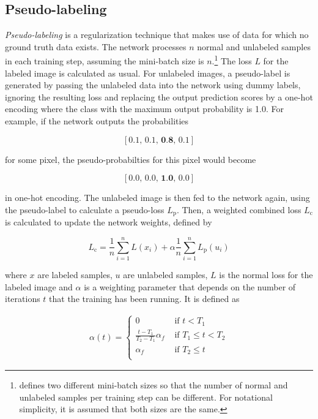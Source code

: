 	\subsection {Pseudo-labeling}
\label{subsec:pseudo_label}

\textit{Pseudo-labeling} \cite{pseudo_label} is a regularization technique that makes use of data for which no ground truth data exists. The network processes $n$ normal and unlabeled samples in each training step, assuming the mini-batch size is $n$.\footnote{\cite{pseudo_label} defines two different mini-batch sizes so that the number of normal and unlabeled samples per training step can be different. For notational simplicity, it is assumed that both sizes are the same.} The loss $L$ for the labeled image is calculated as usual. For unlabeled images, a pseudo-label is generated by passing the unlabeled data into the network using dummy labels, ignoring the resulting loss and replacing the output prediction scores by a one-hot encoding where the class with the maximum output probability is 1.0. For example, if the network outputs the probabilities 

\[ [0.1,\, 0.1,\, \textbf{0.8},\, 0.1] \]

\noindent for some pixel, the pseudo-probabilties for this pixel would become

\[ [0.0,\, 0.0,\, \textbf{1.0},\, 0.0] \]

\noindent in one-hot encoding. The unlabeled image is then fed to the network again, using the pseudo-label to calculate a pseudo-loss $L_\text{p}$. Then, a weighted combined loss $L_\text{c}$ is calculated to update the network weights, defined by

\[ L_\text{c} = \frac{1}{n} \sum \limits_{i=1}^{n} L(x_i) + \alpha \frac{1}{n} \sum \limits_{i=1}^{n} L_\text{p}(u_i)  \]

\noindent where $x$ are labeled samples, $u$ are unlabeled samples, $L$ is the normal loss for the labeled image and $\alpha$ is a weighting parameter that depends on the number of iterations $t$ that the training has been running. It is defined as

\begin {align}
\alpha(t) = \begin{cases} 0 &\text{ if } t < T_1 \\
				\frac{t - T_1}{T_2 - T_1} \alpha_f &\text{ if } T_1 \leq t < T_2 \\
				\alpha_f &\text { if } T_2 \leq t \\
	        \end{cases}
\end {align}

